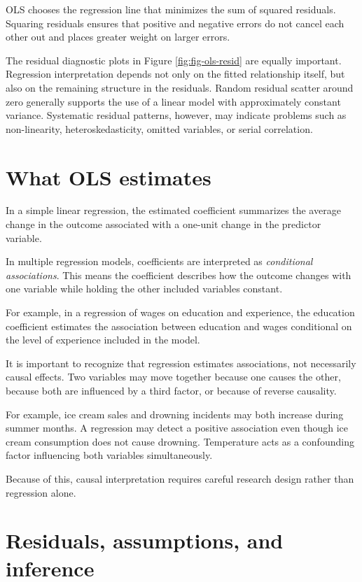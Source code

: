\documentclass[
  11pt,
  oneside]{book}
\begin{document}
OLS chooses the regression line that minimizes the sum of squared residuals. Squaring residuals ensures that positive and negative errors do not cancel each other out and places greater weight on larger errors.

The residual diagnostic plots in Figure \ref{fig:fig-ols-resid} are equally important. Regression interpretation depends not only on the fitted relationship itself, but also on the remaining structure in the residuals. Random residual scatter around zero generally supports the use of a linear model with approximately constant variance. Systematic residual patterns, however, may indicate problems such as non-linearity, heteroskedasticity, omitted variables, or serial correlation.

\section{What OLS estimates}\label{what-ols-estimates}

In a simple linear regression, the estimated coefficient summarizes the average change in the outcome associated with a one-unit change in the predictor variable.

In multiple regression models, coefficients are interpreted as \emph{conditional associations}. This means the coefficient describes how the outcome changes with one variable while holding the other included variables constant.

For example, in a regression of wages on education and experience, the education coefficient estimates the association between education and wages conditional on the level of experience included in the model.

It is important to recognize that regression estimates associations, not necessarily causal effects. Two variables may move together because one causes the other, because both are influenced by a third factor, or because of reverse causality.

For example, ice cream sales and drowning incidents may both increase during summer months. A regression may detect a positive association even though ice cream consumption does not cause drowning. Temperature acts as a confounding factor influencing both variables simultaneously.

Because of this, causal interpretation requires careful research design rather than regression alone.

\section{Residuals, assumptions, and inference}\label{residuals-assumptions-and-inference}
\end{document}
